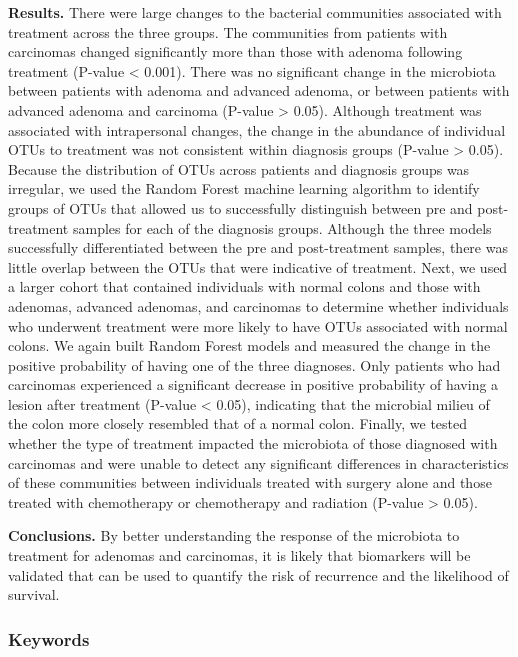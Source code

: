 \documentclass[12pt,]{article}
\begin{document}
\textbf{Results.} There were large changes to the bacterial communities
associated with treatment across the three groups. The communities from
patients with carcinomas changed significantly more than those with
adenoma following treatment (P-value \textless{} 0.001). There was no
significant change in the microbiota between patients with adenoma and
advanced adenoma, or between patients with advanced adenoma and
carcinoma (P-value \textgreater{} 0.05). Although treatment was
associated with intrapersonal changes, the change in the abundance of
individual OTUs to treatment was not consistent within diagnosis groups
(P-value \textgreater{} 0.05). Because the distribution of OTUs across
patients and diagnosis groups was irregular, we used the Random Forest
machine learning algorithm to identify groups of OTUs that allowed us to
successfully distinguish between pre and post-treatment samples for each
of the diagnosis groups. Although the three models successfully
differentiated between the pre and post-treatment samples, there was
little overlap between the OTUs that were indicative of treatment. Next,
we used a larger cohort that contained individuals with normal colons
and those with adenomas, advanced adenomas, and carcinomas to determine
whether individuals who underwent treatment were more likely to have
OTUs associated with normal colons. We again built Random Forest models
and measured the change in the positive probability of having one of the
three diagnoses. Only patients who had carcinomas experienced a
significant decrease in positive probability of having a lesion after
treatment (P-value \textless{} 0.05), indicating that the microbial
milieu of the colon more closely resembled that of a normal colon.
Finally, we tested whether the type of treatment impacted the microbiota
of those diagnosed with carcinomas and were unable to detect any
significant differences in characteristics of these communities between
individuals treated with surgery alone and those treated with
chemotherapy or chemotherapy and radiation (P-value \textgreater{}
0.05).

\textbf{Conclusions.} By better understanding the response of the
microbiota to treatment for adenomas and carcinomas, it is likely that
biomarkers will be validated that can be used to quantify the risk of
recurrence and the likelihood of survival.

\subsubsection{Keywords}\label{keywords}
\end{document}
